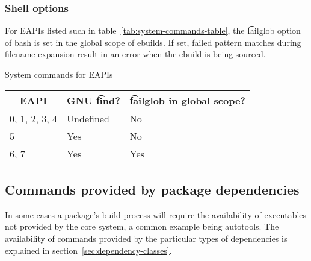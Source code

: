 \subsubsection{Shell options}

 For EAPIs listed such in table~\ref{tab:system-commands-table}, the
\t{failglob} option of bash is set in the global scope of ebuilds. If set, failed pattern matches
during filename expansion result in an error when the ebuild is being sourced.

\begin{centertable}{System commands for EAPIs}
    \label{tab:system-commands-table}
    \begin{tabular}{lll}
      \toprule
      \multicolumn{1}{c}{\textbf{EAPI}} &
      \multicolumn{1}{c}{\textbf{GNU \t{find}?}} &
      \multicolumn{1}{c}{\textbf{\t{failglob} in global scope?}} \\
      \midrule
      0, 1, 2, 3, 4     & Undefined & No  \\
      5                 & Yes       & No  \\
      6, 7              & Yes       & Yes \\
      \bottomrule
    \end{tabular}
\end{centertable}

\subsection{Commands provided by package dependencies}

In some cases a package's build process will require the availability of executables not provided by
the core system, a common example being autotools. The availability of commands provided by the
particular types of dependencies is explained in section~\ref{sec:dependency-classes}.




